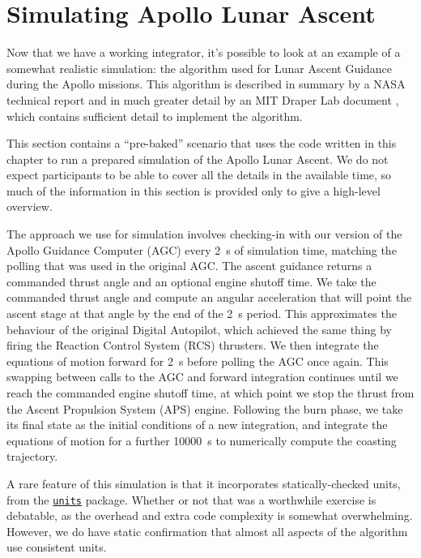 \documentclass[12pt,openany]{book}
\newcommand{\hspackage}[1]{\href{http://hackage.haskell.org/package/#1}{\texttt{#1}}}
\begin{document}
\section{Simulating Apollo Lunar Ascent}

Now that we have a working integrator, it's possible to look at an example of a somewhat realistic simulation: the algorithm used for Lunar Ascent Guidance during the Apollo missions. This algorithm is described in summary by a NASA technical report \cite{bennett1970} and in much greater detail by an MIT Draper Lab document \cite{levine1971}, which contains sufficient detail to implement the algorithm.

This section contains a ``pre-baked'' scenario that uses the code written in this chapter to run a prepared simulation of the Apollo Lunar Ascent. We do not expect participants to be able to cover all the details in the available time, so much of the information in this section is provided only to give a high-level overview.

The approach we use for simulation involves checking-in with our version of the Apollo Guidance Computer (AGC) every \SI{2}{\s} of simulation time, matching the polling that was used in the original AGC. The ascent guidance returns a commanded thrust angle and an optional engine shutoff time. We take the commanded thrust angle and compute an angular acceleration that will point the ascent stage at that angle by the end of the \SI{2}{\s} period. This approximates the behaviour of the original Digital Autopilot, which achieved the same thing by firing the Reaction Control System (RCS) thrusters. We then integrate the equations of motion forward for \SI{2}{\s} before polling the AGC once again. This swapping between calls to the AGC and forward integration continues until we reach the commanded engine shutoff time, at which point we stop the thrust from the Ascent Propulsion System (APS) engine. Following the burn phase, we take its final state as the initial conditions of a new integration, and integrate the equations of motion for a further \SI{10000}{\s} to numerically compute the coasting trajectory.

A rare feature of this simulation is that it incorporates statically-checked units, from the \hspackage{units} package. Whether or not that was a worthwhile exercise is debatable, as the overhead and extra code complexity is somewhat overwhelming. However, we do have static confirmation that almost all aspects of the algorithm use consistent units.
\end{document}
